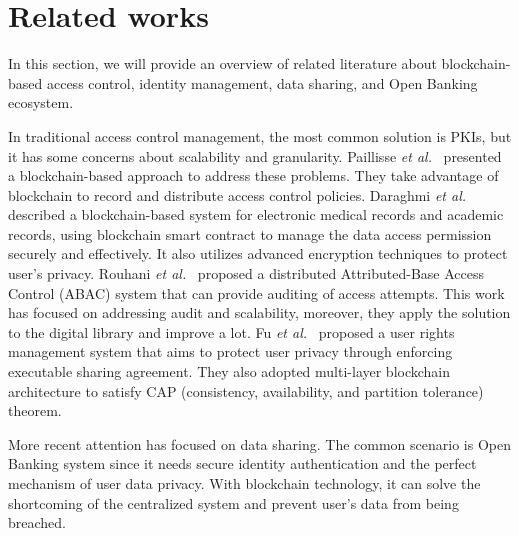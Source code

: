 \section{Related works}
In this section, we will provide an overview of related literature about blockchain-based access control, identity management, data sharing, and Open Banking ecosystem.\par
In traditional access control management, the most common solution is PKIs, but it has some concerns about scalability and granularity. Paillisse \emph{et al.}~\cite{paillisse2019distributed} presented a blockchain-based approach to address these problems. They take advantage of blockchain to record and distribute access control policies. Daraghmi \emph{et al.}~\cite{daraghmi2019medchain,daraghmi2019unichain} described a blockchain-based system for electronic medical records and academic records, using blockchain smart contract to manage the data access permission securely and effectively. It also utilizes advanced encryption techniques to protect user's privacy. 
Rouhani \emph{et al.}~\cite{rouhani2020distributed} proposed a distributed Attributed-Base Access Control (ABAC) system that can provide auditing of access attempts. This work has focused on addressing audit and scalability, moreover, they apply the solution to the digital library and improve a lot.
Fu \emph{et al.}~\cite{fu2020soteria} proposed a user rights management system that aims to protect user privacy through enforcing executable sharing agreement. They also adopted multi-layer blockchain architecture to satisfy CAP (consistency, availability, and partition tolerance) theorem.\par

More recent attention has focused on data sharing. The common scenario is Open Banking system since it needs secure identity authentication and the perfect mechanism of user data privacy. With blockchain technology, it can solve the shortcoming of the centralized system and prevent user's data from being breached.